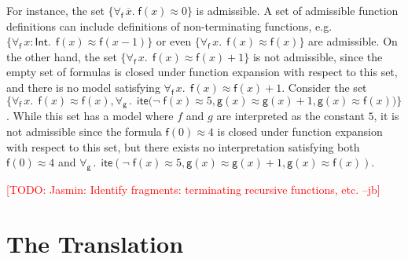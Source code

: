 \documentclass[runningheads,a4paper]{llncs}
\newcommand{\con}[1]{\mathsf{#1}}
\renewcommand\vec[1]{\overline{#1}}
\let\oldneg=\neg
\def\neg{\oldneg\;}
\newcommand{\teq}{\approx}
\newcommand{\sortint}{\ty{Int}}
\newcommand\ty[1]{\con{#1}}
\newcommand{\lite}{\con{ite}}
\newcommand{\forallf}[1]{\forall_{\!#1\:}}
\newcommand{\rem}[1]{\textcolor{red}{[#1]}}
\newcommand{\jb}[1]{\rem{#1 --jb}}
\begin{document}
For instance, the set $\{ \forallf{\con{f}} \vec x.\; \con{f}( x ) \teq 0 \}$ is admissible.
A set of admissible function definitions can include definitions of non-terminating functions, e.g.
$\{ \forallf{\con{f}} x : \sortint.\;\, \con{f}( x ) \teq \con{f}( x - 1 ) \}$ or even $\{ \forallf{\con{f}} x.\;\, \con{f}( x ) \teq \con{f}( x ) \}$ are admissible.
On the other hand, the set $\{ \forallf{\con{f}} x.\;\, \con{f}( x ) \teq \con{f}( x ) + 1 \}$ is not admissible,
since the empty set of formulas is closed under function expansion with respect to this set,
and there is no model satisfying $\forallf{\con{f}} x.\;\, \con{f}( x ) \teq \con{f}( x ) + 1$.
Consider the set $\{ \forallf{\con{f}} x.\;\, \con{f}( x ) \teq \con{f}( x ), \forallf{\con{g}}.\;\, \lite\bigl( \neg \con{f}( x ) \teq 5, \con{g}( x ) \teq \con{g}( x ) + 1, \con{g}( x ) \teq \con{f}( x ) \bigr) \}$.
While this set has a model where $f$ and $g$ are interpreted as the constant $5$, it is not admissible
since the formula $\con{f}( 0 ) \teq 4$ is closed under function expansion with respect to this set,
but there exists no interpretation satisfying both $\con{f}( 0 ) \teq 4$ and $\forallf{\con{g}}.\;\, \lite( \neg \con{f}( x ) \teq 5, \con{g}( x ) \teq \con{g}( x ) + 1, \con{g}( x ) \teq \con{f}( x ) )$.


\jb{TODO: Jasmin: Identify fragments: terminating recursive functions, etc.}


\section{The Translation}
\label{sec:encoding}
\end{document}

